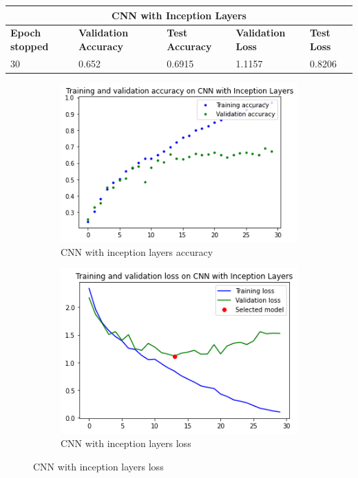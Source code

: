 \medskip

\begin{tabular}{ |p{2cm}|p{2cm}|p{2cm}|p{2cm}|p{2cm}|  }
\hline
\multicolumn{5}{|c|}{CNN with Inception Layers} \\
\hline
\textbf{Epoch stopped} & \textbf{Validation Accuracy} & \textbf{Test Accuracy} & \textbf{Validation Loss} & \textbf{Test Loss} \\
\hline
30 & 0.652 & 0.6915 & 1.1157 & 0.8206\\
\hline
\end{tabular}

\medskip


\begin{figure}[H]
	\begin{subfigure}{0.5\textwidth}
		\includegraphics[width=0.9\linewidth]{img/scratch/inception_layer_acc.png} 
		\caption{CNN with inception layers accuracy}
		\label{fig:InceptionLayeracc}
	\end{subfigure}
	\begin{subfigure}{0.5\textwidth}
		\includegraphics[width=0.9\linewidth]{img/scratch/inception_layer_loss.png}
		\caption{CNN with inception layers loss}
		\label{fig:InceptionLayerloss}
	\end{subfigure}
\end{figure}

